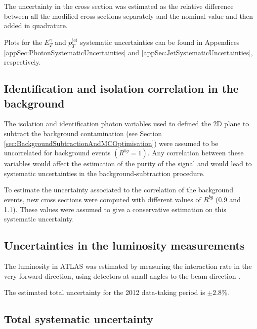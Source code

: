 \documentclass[12pt, twoside]{article}
\numberwithin{equation}{section}
\numberwithin{figure}{section}
\begin{document}
The uncertainty in the cross section was estimated as the relative difference between all the modified cross sections separately and the nominal value and then added in quadrature.

Plots for the $E^{\gamma}_{T}$ and $p^{\text{jet}}_{T}$ systematic uncertainties can be found in Appendices \ref{appSec:PhotonSystematicUncertainties} and \ref{appSec:JetSystematicUncertainties}, respectively.

\newpage
\subsection{Identification and isolation correlation in the background}
\label{subsec:IdentificationAndIsolationCorrelationInTheBackground}

The isolation and identification photon variables used to defined the 2D plane to subtract the background contamination (see Section \ref{sec:BackgroundSubtractionAndMCOptimisation}) were assumed to be uncorrelated for background events $\left( R^{bg} = 1 \right)$. Any correlation between these variables would affect the estimation of the purity of the signal and would lead to systematic uncertainties in the background-subtraction procedure.

To estimate the uncertainty associated to the correlation of the background events, new cross sections were computed with different values of $R^{bg}$ (0.9 and 1.1). These values were assumed to give a conservative estimation on this systematic uncertainty.

\subsection{Uncertainties in the luminosity measurements}
\label{subsec:UncertaintiesInTheLuminosityMeasurements}

The luminosity in ATLAS was estimated by measuring the interaction rate in the very forward direction, using detectors at small angles to the beam direction \cite{luminosityUncertainty}.

The estimated total uncertainty for the 2012 data-taking period is $\pm 2.8 \%$.

\subsection{Total systematic uncertainty}
\label{subsec:TotalSystematicUncertainty}
\end{document}
